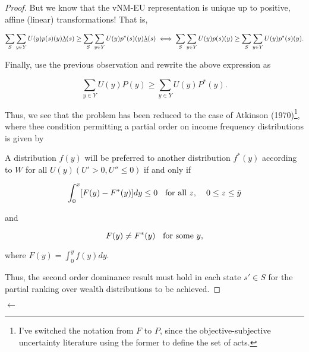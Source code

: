 \documentclass[\econtexRoot/IneqMeas]{subfiles}
\begin{document}
\begin{proof}
	\par But we know that the vNM-EU representation is unique up to positive, affine (linear) transformations! That is,
	
$$  \sum_{S} \sum_{y \in Y} U(y)p(s)(y) \underbar{$\lambda$}(s) \geq  \sum_{S} \sum_{y \in Y} U(y)p^{*}(s)(y) \underbar{$\lambda$}(s) \iff \sum_{S} \sum_{y \in Y} U(y)p(s)(y) \geq  \sum_{S} \sum_{y \in Y} U(y)p^{*}(s)(y).$$	

	\par Finally, use the previous observation and rewrite the above expression as
	
$$  \sum_{y \in Y} U(y)P(y) \geq \sum_{y \in Y} U(y)P^*(y).$$	

	\par Thus, we see that the problem has been reduced to the case of Atkinson (1970)\footnote{I've switched the notation from $F$ to $P$, since the objective-subjective uncertainty literature using the former to define the set of acts.}, where thee condition permitting a partial order on income frequency distributions is given by
	
\begin{prop}
A distribution $f(y)$ will be preferred to another distribution $f^{*}(y)$ according to $W$ for all $U(y) (U' > 0, U'' \leq 0)$ if and only if

$$ \int_{0}^{x} [F(y) -F^{*}(y)]dy \leq 0 \text{\hspace{2mm} for all $z$, \hspace{2mm} $0 \leq z \leq \bar{y}$} $$  

and 

$$F(y) \neq F^{*}(y) \text{\hspace{2mm} for some $y$,}$$

where $F(y) = \int_{0}^{y} f(y)dy. $
\end{prop}
	
	\par Thus, the second order dominance result must hold in each state $s' \in S$ for the partial ranking over wealth distributions to be achieved. 
	
\end{proof}	

$\leftarrow$
\end{document}
